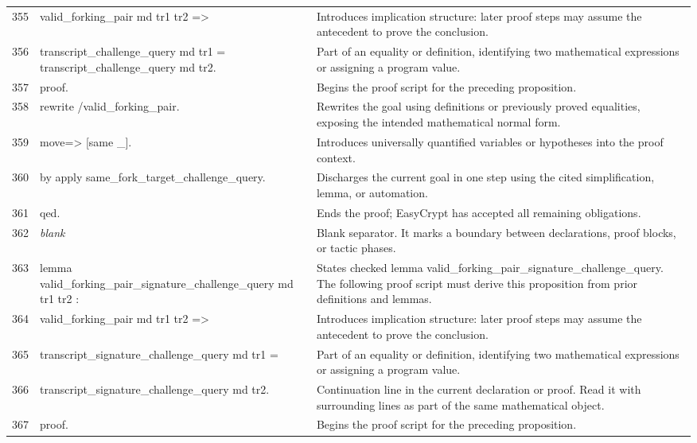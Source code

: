 \documentclass[10pt]{article}
\begin{document}
\begin{longtable}{r L{0.53\textwidth} L{0.37\textwidth}}
355 & {\ttfamily\scriptsize   valid\_forking\_pair md tr1 tr2 =>} & Introduces implication structure: later proof steps may assume the antecedent to prove the conclusion. \\
356 & {\ttfamily\scriptsize   transcript\_challenge\_query md tr1 = transcript\_challenge\_query md tr2.} & Part of an equality or definition, identifying two mathematical expressions or assigning a program value. \\
357 & {\ttfamily\scriptsize proof.} & Begins the proof script for the preceding proposition. \\
358 & {\ttfamily\scriptsize rewrite /valid\_forking\_pair.} & Rewrites the goal using definitions or previously proved equalities, exposing the intended mathematical normal form. \\
359 & {\ttfamily\scriptsize move=> [same \_].} & Introduces universally quantified variables or hypotheses into the proof context. \\
360 & {\ttfamily\scriptsize by apply same\_fork\_target\_challenge\_query.} & Discharges the current goal in one step using the cited simplification, lemma, or automation. \\
361 & {\ttfamily\scriptsize qed.} & Ends the proof; EasyCrypt has accepted all remaining obligations. \\
362 & {\ttfamily\scriptsize \emph{blank}} & Blank separator.  It marks a boundary between declarations, proof blocks, or tactic phases. \\
363 & {\ttfamily\scriptsize lemma valid\_forking\_pair\_signature\_challenge\_query md tr1 tr2 :} & States checked lemma valid\_forking\_pair\_signature\_challenge\_query.  The following proof script must derive this proposition from prior definitions and lemmas. \\
364 & {\ttfamily\scriptsize   valid\_forking\_pair md tr1 tr2 =>} & Introduces implication structure: later proof steps may assume the antecedent to prove the conclusion. \\
365 & {\ttfamily\scriptsize   transcript\_signature\_challenge\_query md tr1 =} & Part of an equality or definition, identifying two mathematical expressions or assigning a program value. \\
366 & {\ttfamily\scriptsize   transcript\_signature\_challenge\_query md tr2.} & Continuation line in the current declaration or proof.  Read it with surrounding lines as part of the same mathematical object. \\
367 & {\ttfamily\scriptsize proof.} & Begins the proof script for the preceding proposition. \\

\end{longtable}
\end{document}
